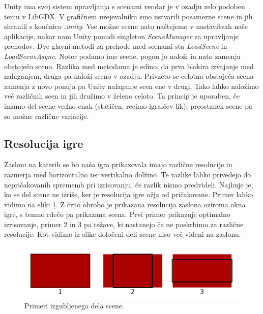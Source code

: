 \documentclass[12pt,a4paper,twoside]{book}
\begin{document}
Unity ima svoj sistem upravljanja s scenami vendar je v ozadju zelo podoben temu v LibGDX. V grafičnem urejevalniku smo ustvarili posamezne scene in jih shranili s končnico \textit{.unity}. Vse možne scene nato naštejemo v nastavitvah naše aplikacije, nakar nam Unity ponudi singleton \textit{SceneManager} za upravljanje prehodov. Dve glavni metodi za prehode med scenami sta \textit{LoadScene} in \textit{LoadSceneAsync}. Noter podamo ime scene, pogon jo naloži in nato zamenja obstoječo sceno. Razlika med metodama je edino, da prva blokira izvajanje med nalaganjem, druga pa naloži sceno v ozadju. Privzeto se celotna obstoječa scena zamenja z novo ponuja pa Unity nalaganje scen ene v drugi. Tako lahko naložimo več različnih scen in jih družimo v želeno celoto. Ta princip je uporaben, če imamo del scene vedno enak (statičen, recimo igralčev lik), preostanek scene pa so možne različne variacije.

\subsection{Resolucija igre}
Zasloni na katerih se bo naša igra prikazovala imajo različne resolucije in razmerja med horizontalno ter vertikalno dolžino. Te razlike lahko privedejo do nepričakovanih sprememb pri izrisovanju, če razlik nismo predvideli. Najhuje je, ko se del scene ne izriše, ker je resolucija igre ožja od pričakovane. Primer lahko vidimo na sliki \ref{slika:rezanje}. Z črno obrobo je prikazana resolucija zaslona oziroma okna igre, s temno rdečo pa prikazana scena. Prvi primer prikazuje optimalno izrisovanje, primer 2 in 3 pa težave, ki nastanejo če ne poskrbimo za različne resolucije. Kot vidimo iz slike določeni deli scene niso več videni na zaslonu.

\begin{figure}[h]
	\centering
	\includegraphics[width=12cm]{rezanjeResolucije}
	\caption{Primeri izgubljenega dela scene.}
	\label{slika:rezanje}
\end{figure}
\end{document}
